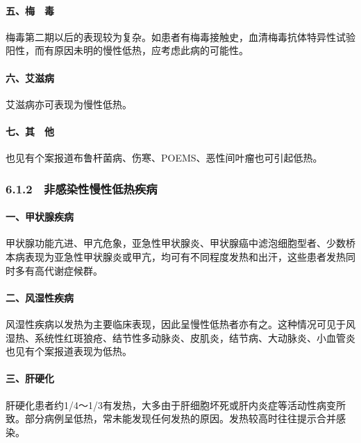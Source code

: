 \paragraph{五、梅　毒}

梅毒第二期以后的表现较为复杂。如患者有梅毒接触史，血清梅毒抗体特异性试验阳性，而有原因未明的慢性低热，应考虑此病的可能性。

\paragraph{六、艾滋病}

艾滋病亦可表现为慢性低热。

\paragraph{七、其　他}

也见有个案报道布鲁杆菌病、伤寒、POEMS、恶性间叶瘤也可引起低热。

\protect\hypertarget{text00040.html}{}{}

\subsubsection{6.1.2　非感染性慢性低热疾病}

\paragraph{一、甲状腺疾病}

甲状腺功能亢进、甲亢危象，亚急性甲状腺炎、甲状腺癌中滤泡细胞型者、少数桥本病表现为亚急性甲状腺炎或甲亢，均可有不同程度发热和出汗，这些患者发热同时多有高代谢症候群。

\paragraph{二、风湿性疾病}

风湿性疾病以发热为主要临床表现，因此呈慢性低热者亦有之。这种情况可见于风湿热、系统性红斑狼疮、结节性多动脉炎、皮肌炎，结节病、大动脉炎、小血管炎也见有个案报道表现为低热。

\paragraph{三、肝硬化}

肝硬化患者约1/4～1/3有发热，大多由于肝细胞坏死或肝内炎症等活动性病变所致。部分病例呈低热，常未能发现任何发热的原因。发热较高时往往提示合并感染。

